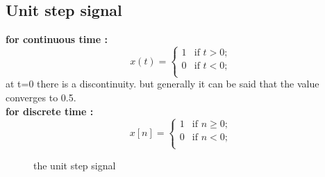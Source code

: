 \documentclass[a4paper,12pt]{book}
\begin{document}
\subsection*{Unit step signal}
{\bf for continuous time :}\\
	\[ x(t) = \left\{ \begin{array}{ll}

	1 & \mbox{if $t > 0$;} \\

	0 & \mbox{if $t < 0$;} \\

	\end{array}
	\right. \]
at t=0 there is a discontinuity. but generally it can be said that the value converges to 0.5.\\
\bigskip
{\bf for discrete time :}\\
	\[ x[n] = \left\{ \begin{array}{ll}

	1 & \mbox{if $n \geq 0$;} \\

	0 & \mbox{if $n < 0$;} \\

	\end{array}
	\right. \]

\begin{figure}[h]  
\centering 
{}\hspace{6mm}
\caption{the unit step signal} \label{fig:M}  
\end{figure}
\end{document}
